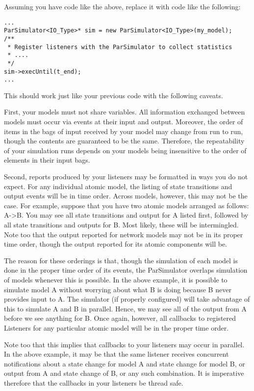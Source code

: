 Assuming you have code like the above, replace it with code like the following:
\begin{verbatim}
...
ParSimulator<IO_Type>* sim = new ParSimulator<IO_Type>(my_model);
/**
 * Register listeners with the ParSimulator to collect statistics
 * ....
 */
sim->execUntil(t_end);
...
\end{verbatim}
This should work just like your previous code with the following caveats.

First, your models must not share variables. All information exchanged between models must occur via events at their input and output. Moreover, the order of items in the bags of input received by your model may change from run to run, though the contents are guaranteed to be the same. Therefore, the repeatability of your simulation runs depends on your models being insensitive to the order of elements in their input bags.

Second, reports produced by your listeners may be formatted in ways you do not expect. For any individual atomic model, the listing of state transitions and output events will be in time order. Across models, however, this may not be the case. For example, suppose that you have two atomic models arranged as follows: A->B. You may see all state transitions and output for A listed first, followed by all state transitions and outputs for B. Most likely, these will be intermingled. Note too that the output reported for network models may not be in its proper time order, though the output reported for its atomic components will be.

The reason for these orderings is that, though the simulation of each model is done in the proper time order of its events, the ParSimulator overlaps simulation of models whenever this is possible. In the above example, it is possible to simulate model A without worrying about what B is doing because B never provides input to A. The simulator (if properly configured) will take advantage of this to simulate A and B in parallel. Hence, we may see all of the output from A before we see anything for B. Once again, however, all callbacks to registered Listeners for any particular atomic model will be in the proper time order.

Note too that this implies that callbacks to your listeners may occur in parallel. In the above example, it may be that the same listener receives concurrent notifications about a state change for model A and state change for model B, or output from A and state change of B, or any such combination. It is imperative therefore that the callbacks in your listeners be thread safe.

